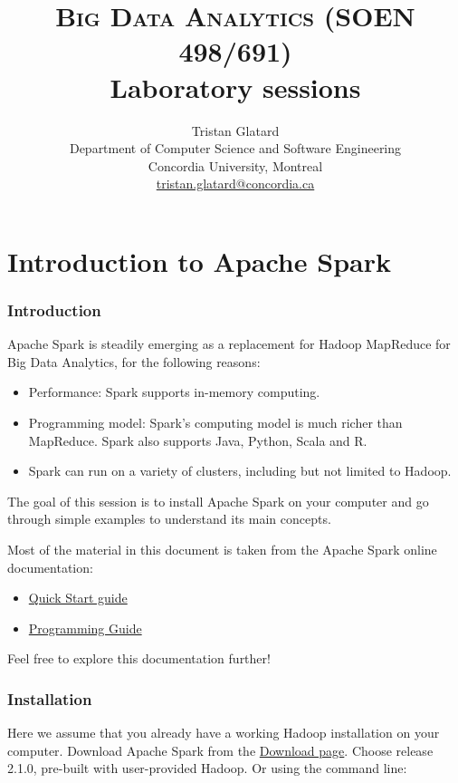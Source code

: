 \documentclass[11pt]{article}
\title{\textsc{Big Data Analytics (SOEN 498/691)} \\ Laboratory sessions}
\author{Tristan Glatard\\Department of Computer Science and Software Engineering\\Concordia University, Montreal\\\href{mailto:tristan.glatard@concordia.ca}{tristan.glatard@concordia.ca}}
\begin{document}
\maketitle

\newpage

\tableofcontents

\newpage

\part{Introduction to Apache Spark}

\section{Introduction}

Apache Spark is steadily emerging as a replacement for Hadoop
MapReduce for Big Data Analytics, for the following reasons:
\begin{itemize}
\item Performance: Spark supports in-memory computing.
\item Programming model: Spark's computing model is much richer than
  MapReduce. Spark also supports Java, Python, Scala and R.
  \item Spark can run on a variety of clusters, including but not
    limited to Hadoop.
\end{itemize}

The goal of this session is to install Apache Spark on your computer
and go through simple examples to understand its main concepts.

Most of the material in this document is taken from the Apache Spark online documentation:
\begin{itemize}
\item  \href{http://spark.apache.org/docs/latest/quick-start.html}{Quick Start guide}
\item \href{http://spark.apache.org/docs/latest/programming-guide.html}{Programming Guide}
\end{itemize}
Feel free to explore this documentation further!

\section{Installation}

Here we assume that you already have a working Hadoop installation on
your computer. Download Apache Spark from the
\href{http://spark.apache.org/downloads.html}{Download page}. Choose
release 2.1.0, pre-built with user-provided Hadoop. Or using the
command line:
\end{document}
